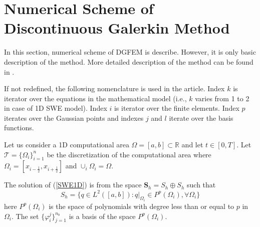 \section{Numerical Scheme of Discontinuous Galerkin Method}\label{NS}
In this section, numerical scheme of DGFEM is describe. However, it is only basic description of the method. More detailed description of the method can be found in \cite{reed1973}. 

If not redefined, the following nomenclature is used in the article. Index $k$ is iterator over the equations in the mathematical model (i.e., $k$ varies from 1 to 2 in case of 1D SWE model). Index $i$ is iterator over the finite elements. Index $p$ iterates over the Gaussian points and indexes $j$ and $l$ iterate over the basis functions.

Let us consider a 1D computational area $\Omega=[a,b] \subset \mathbb{R}$ and let $t\in[0,T]$. Let $\mathcal{T}=\lbrace \Omega_i \rbrace_{i=1}^n$ be the discretization of the computational area where $\Omega_i=[x_{i-\frac12},x_{i+\frac12}]$ and $\cup_{i}\Omega_i=\Omega$.

The solution of (\ref{SWE1D}) is from the space $\mathbf{S}_h=S_h\oplus S_h$ such that
\begin{equation}
S_h=\lbrace q \in L^2([a,b]):q|_{\Omega_i}\in P^p(\Omega_i),\forall \Omega_i\rbrace
\end{equation}
  here $P^p(\Omega_i)$ is the space of polynomials with degree less than or equal to $p$ in $\Omega_i$. The set $\lbrace \varphi_i^j \rbrace_{j=1}^{n_b}$ is a basis of the space $P^p(\Omega_i)$.

